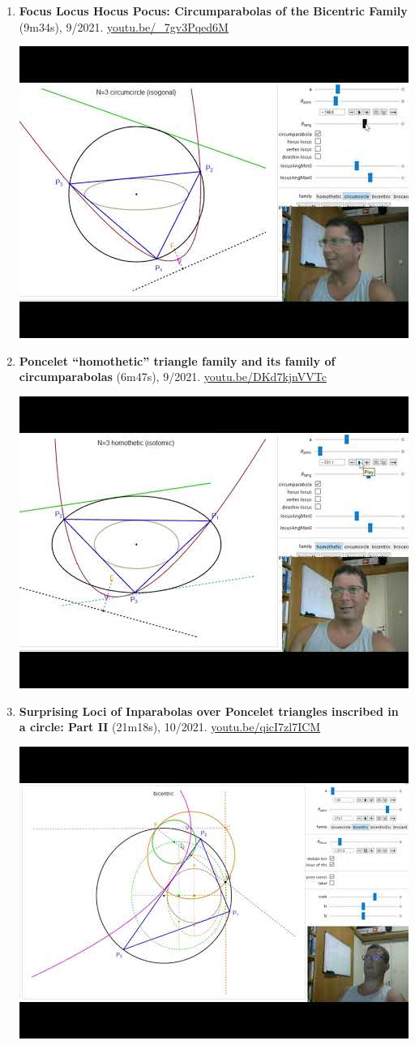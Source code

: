 \documentclass[12pt]{article}
\begin{document}
\begin{enumerate}[resume]
% 
\item \textbf{Focus Locus Hocus Pocus: Circumparabolas of the Bicentric Family} (9m34s), 9/2021. \href{https://youtu.be/_7gv3Pqed6M}{\url{youtu.be/\_7gv3Pqed6M}}
\begin{center}\includegraphics[width=.5\textwidth]{pics/_7gv3Pqed6M.jpg}\end{center}
% 
\item \textbf{Poncelet ``homothetic'' triangle family and its family of circumparabolas} (6m47s), 9/2021. \href{https://youtu.be/DKd7kjnVVTc}{\url{youtu.be/DKd7kjnVVTc}}
\begin{center}\includegraphics[width=.5\textwidth]{pics/DKd7kjnVVTc.jpg}\end{center}
% 
\item \textbf{Surprising Loci of Inparabolas over Poncelet triangles inscribed in a circle: Part II} (21m18s), 10/2021. \href{https://youtu.be/qicI7zl7ICM}{\url{youtu.be/qicI7zl7ICM}}
\begin{center}\includegraphics[width=.5\textwidth]{pics/qicI7zl7ICM.jpg}\end{center}

\end{enumerate}
\end{document}
